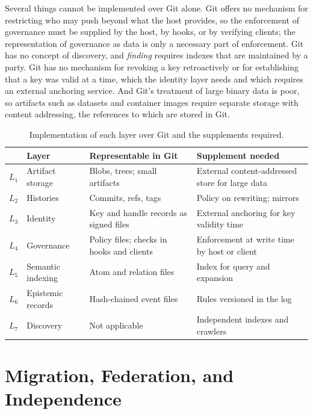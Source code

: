 \documentclass[11pt,twoside,openright]{book}
\theoremstyle{plain}
\theoremstyle{definition}
\theoremstyle{remark}
\begin{document}
Several things cannot be implemented over Git alone. Git offers no mechanism for restricting who may push beyond what the host provides, so the enforcement of governance must be supplied by the host, by hooks, or by verifying clients; the representation of governance as data is only a necessary part of enforcement. Git has no concept of discovery, and \emph{finding} requires indexes that are maintained by a party. Git has no mechanism for revoking a key retroactively or for establishing that a key was valid at a time, which the identity layer needs and which requires an external anchoring service. And Git's treatment of large binary data is poor, so artifacts such as datasets and container images require separate storage with content addressing, the references to which are stored in Git.

\begin{table}[t]
\centering
\caption{Implementation of each layer over Git and the supplements required.}
\label{tab:overgit}
\small
\begin{tabular}{p{}p{}p{}p{}}
\toprule
 & Layer & Representable in Git & Supplement needed \\
\midrule
$L_1$ & Artifact storage & Blobs, trees; small artifacts & External content-addressed store for large data \\
$L_2$ & Histories & Commits, refs, tags & Policy on rewriting; mirrors \\
$L_3$ & Identity & Key and handle records as signed files & External anchoring for key validity time \\
$L_4$ & Governance & Policy files; checks in hooks and clients & Enforcement at write time by host or client \\
$L_5$ & Semantic indexing & Atom and relation files & Index for query and expansion \\
$L_6$ & Epistemic records & Hash-chained event files & Rules versioned in the log \\
$L_7$ & Discovery & Not applicable & Independent indexes and crawlers \\
\bottomrule
\end{tabular}
\end{table}

\chapter{Migration, Federation, and Independence}\label{ch:migration}
\end{document}
